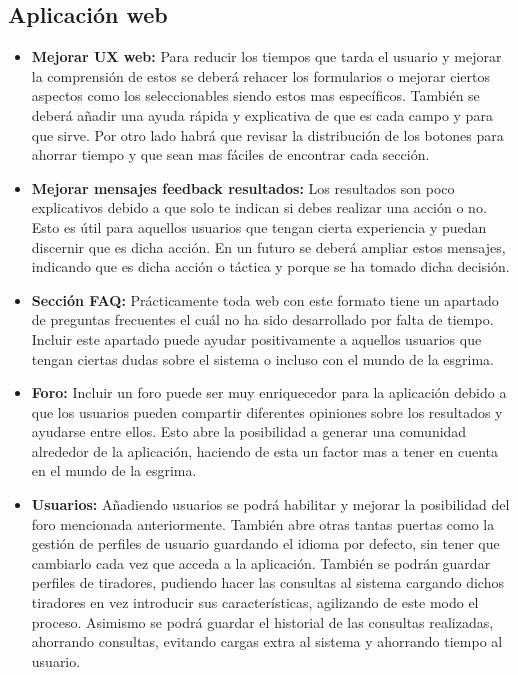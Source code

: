 \subsection{Aplicación web}
\begin{itemize}
  \item \textbf{Mejorar UX web:} Para reducir los tiempos que tarda el usuario y mejorar
    la comprensión de estos se deberá rehacer los formularios o mejorar ciertos aspectos
    como los seleccionables siendo estos mas específicos. También se deberá añadir una
    ayuda rápida y explicativa de que es cada campo y para que sirve. Por otro lado
    habrá que revisar la distribución de los botones para ahorrar tiempo y que sean mas
    fáciles de encontrar cada sección.
  \item \textbf{Mejorar mensajes feedback resultados:} Los resultados son poco explicativos
    debido a que solo te indican si debes realizar una acción o no. Esto es útil para aquellos
    usuarios que tengan cierta experiencia y puedan discernir que es dicha acción. En un futuro
    se deberá ampliar estos mensajes, indicando que es dicha acción o táctica y porque se ha
    tomado dicha decisión.
  \item \textbf{Sección FAQ:} Prácticamente toda web con este formato tiene un apartado de
    preguntas frecuentes el cuál no ha sido desarrollado por falta de tiempo. Incluir este apartado
    puede ayudar positivamente a aquellos usuarios que tengan ciertas dudas sobre el sistema
    o incluso con el mundo de la esgrima.
  \item \textbf{Foro:} Incluir un foro puede ser muy enriquecedor para la aplicación debido a que
    los usuarios pueden compartir diferentes opiniones sobre los resultados y ayudarse entre ellos.
    Esto abre la posibilidad a generar una comunidad alrededor de la aplicación, haciendo de esta
    un factor mas a tener en cuenta en el mundo de la esgrima.
  \item \textbf{Usuarios:} Añadiendo usuarios se podrá habilitar y mejorar la posibilidad del foro
    mencionada anteriormente. También abre otras tantas puertas como la gestión de perfiles de usuario
    guardando el idioma por defecto, sin tener que cambiarlo cada vez que acceda a la aplicación.
    También se podrán guardar perfiles de tiradores, pudiendo hacer las consultas al sistema
    cargando dichos tiradores en vez introducir sus características, agilizando de este modo
    el proceso. Asimismo se podrá guardar el historial de las consultas realizadas, ahorrando
    consultas, evitando cargas extra al sistema y ahorrando tiempo al usuario.

\end{itemize}
